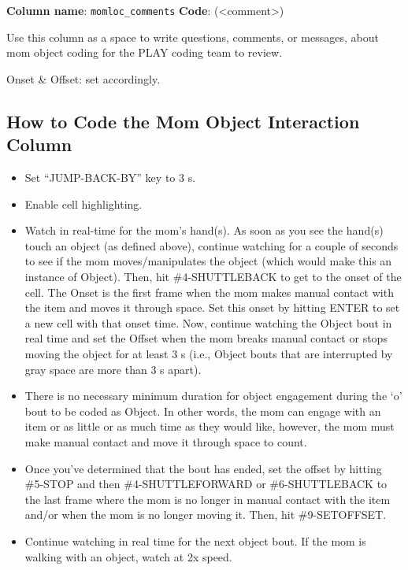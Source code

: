 \documentclass[
]{book}
\providecommand{\tightlist}{%
  \setlength{\itemsep}{0pt}\setlength{\parskip}{0pt}}
\begin{document}
\textbf{Column name}: \texttt{momloc\_comments}
\textbf{Code}: (\textless comment\textgreater)

Use this column as a space to write questions, comments, or messages, about mom object coding for the PLAY coding team to review.

Onset \& Offset: set accordingly.

\hypertarget{how-to-code-the-mom-object-interaction-column}{%
\subsection*{How to Code the Mom Object Interaction Column}\label{how-to-code-the-mom-object-interaction-column}}

\begin{itemize}
\tightlist
\item
  Set ``JUMP-BACK-BY'' key to 3 s.
\item
  Enable cell highlighting.
\item
  Watch in real-time for the mom's hand(s). As soon as you see the hand(s) touch an object (as defined above), continue watching for a couple of seconds to see if the mom moves/manipulates the object (which would make this an instance of Object). Then, hit \#4-SHUTTLEBACK to get to the onset of the cell. The Onset is the first frame when the mom makes manual contact with the item and moves it through space. Set this onset by hitting ENTER to set a new cell with that onset time. Now, continue watching the Object bout in real time and set the Offset when the mom breaks manual contact or stops moving the object for at least 3 s (i.e., Object bouts that are interrupted by gray space are more than 3 s apart).
\item
  There is no necessary minimum duration for object engagement during the `o' bout to be coded as Object. In other words, the mom can engage with an item or as little or as much time as they would like, however, the mom must make manual contact and move it through space to count.
\item
  Once you've determined that the bout has ended, set the offset by hitting \#5-STOP and then \#4-SHUTTLEFORWARD or \#6-SHUTTLEBACK to the last frame where the mom is no longer in manual contact with the item and/or when the mom is no longer moving it. Then, hit \#9-SETOFFSET.
\item
  Continue watching in real time for the next object bout. If the mom is walking with an object, watch at 2x speed.

\end{itemize}
\end{document}
